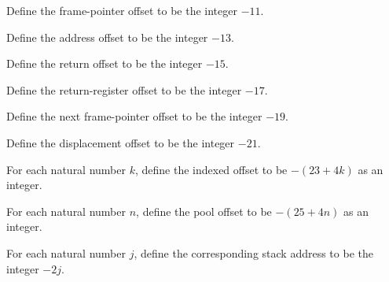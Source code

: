 \begin{definition}
\label{Light.Compiler.cFP}
\leanok
Define the frame-pointer offset to be the integer $-11$.
\end{definition}

\begin{definition}
\label{Light.Compiler.cADDR}
\leanok
Define the address offset to be the integer $-13$.
\end{definition}

\begin{definition}
\label{Light.Compiler.cRET}
\leanok
Define the return offset to be the integer $-15$.
\end{definition}

\begin{definition}
\label{Light.Compiler.cRR}
\leanok
Define the return-register offset to be the integer $-17$.
\end{definition}

\begin{definition}
\label{Light.Compiler.cNFP}
\leanok
Define the next frame-pointer offset to be the integer $-19$.
\end{definition}

\begin{definition}
\label{Light.Compiler.cD}
\leanok
Define the displacement offset to be the integer $-21$.
\end{definition}

\begin{definition}
\label{Light.Compiler.cT}
\leanok
For each natural number $k$, define the indexed offset to be $-(23+4k)$ as an integer.
\end{definition}

\begin{definition}
\label{Light.Compiler.cPool}
\leanok
For each natural number $n$, define the pool offset to be $-(25+4n)$ as an integer.
\end{definition}

\begin{definition}
\label{Light.Compiler.cStack}
\leanok
For each natural number $j$, define the corresponding stack address to be the integer
$-2j$.
\end{definition}

